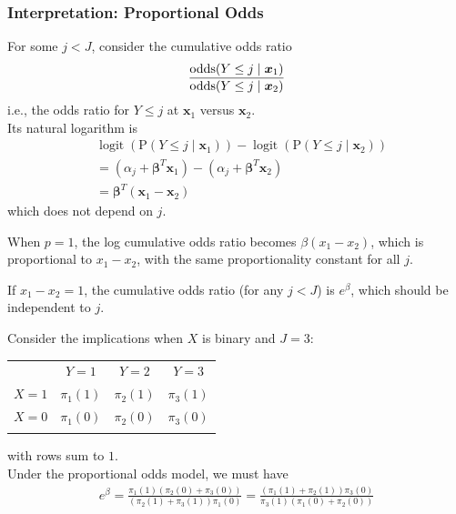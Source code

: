 \documentclass[11pt]{elegantbook}
\begin{document}
\subsubsection*{Interpretation: Proportional Odds}
For some $j<J$, consider the cumulative odds ratio
\begin{equation}
    \begin{aligned}
        \frac{\textnormal{odds}(Y\leq j\mid \boldsymbol{x}_1)}{\textnormal{odds}(Y\leq j\mid \boldsymbol{x}_2)}
    \end{aligned}
    \nonumber
\end{equation}
i.e., the odds ratio for $Y \leq j$ at $\boldsymbol{x}_1$ versus $\boldsymbol{x}_2$.\\
Its natural logarithm is
$$
\begin{aligned}
& \operatorname{logit}\left(\mathrm{P}\left(Y \leq j \mid \boldsymbol{x}_1\right)\right)-\operatorname{logit}\left(\mathrm{P}\left(Y \leq j \mid \boldsymbol{x}_2\right)\right) \\
&=\left(\alpha_j+\boldsymbol{\beta}^T \boldsymbol{x}_1\right)-\left(\alpha_j+\boldsymbol{\beta}^T \boldsymbol{x}_2\right) \\
&=\boldsymbol{\beta}^T\left(\boldsymbol{x}_1-\boldsymbol{x}_2\right)
\end{aligned}
$$
which does not depend on $j$.

When $p = 1$, the log cumulative odds ratio becomes $\beta (x_1-x_2)$, which is proportional to $x_1-x_2$, with the same proportionality constant for all $j$.

If $x_1-x_2=1$, the cumulative odds ratio (for any $j<J$) is $e^\beta$, which should be independent to $j$.

\begin{example}
    Consider the implications when $X$ is binary and $J = 3$:
    \begin{center}
        \begin{tabular}{rccccc}
        \multicolumn{1}{r}{}&\multicolumn{2}{c}{$Y=1$}&\multicolumn{2}{c}{$Y=2$}&\multicolumn{1}{c}{$Y=3$}\\
        \cline{2-6}
        \multicolumn{1}{r|}{$X=1$}&\multicolumn{2}{c|}{$\pi_1(1)$}&\multicolumn{2}{c|}{$\pi_2(1)$}&\multicolumn{1}{c|}{$\pi_3(1)$}\\
        \cline{2-6}
        \multicolumn{1}{r|}{$X=0$}&\multicolumn{2}{c|}{$\pi_1(0)$}&\multicolumn{2}{c|}{$\pi_2(0)$}&\multicolumn{1}{c|}{$\pi_3(0)$}\\
        \cline{2-6}
        \multicolumn{1}{c}{}&&&&&
        \end{tabular}
    \end{center}
    with rows sum to $1$.\\
    Under the proportional odds model, we must have
    \begin{equation}
        \begin{aligned}
            e^\beta=\frac{\pi_1(1)(\pi_2(0)+\pi_3(0))}{(\pi_2(1)+\pi_3(1))\pi_1(0)}=\frac{(\pi_1(1)+\pi_2(1))\pi_3(0)}{\pi_3(1)(\pi_1(0)+\pi_2(0))}
        \end{aligned}
        \nonumber
    \end{equation}
\end{example}
\end{document}
